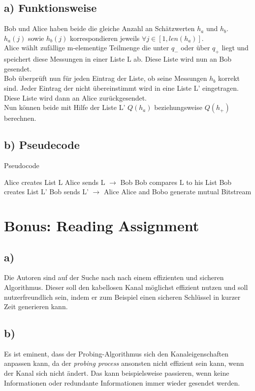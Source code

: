 \documentclass[12pt,a4paper]{article}
\begin{document}
\subsection*{a) Funktionsweise}
Bob und Alice haben beide die gleiche Anzahl an Schätzwerten $h_a$ und $h_b$.\\
$h_a(j)$ sowie $h_b(j)$ korrespondieren jeweils $\forall j \in [1,len(h_a)]$.\\
Alice wählt zufällige m-elementige Teilmenge die unter 
$q_-$ oder über $q_+$ liegt und speichert diese Messungen 
in einer Liste L ab. Diese Liste wird nun an Bob gesendet.\\
Bob überprüft nun für jeden Eintrag der Liste, ob seine 
Messungen $h_b$ korrekt sind. Jeder Eintrag der nicht 
übereinstimmt wird in eine Liste L' eingetragen. 
Diese Liste wird dann an Alice zurückgesendet.\\
Nun können beide mit Hilfe der Liste L' $Q(h_a)$ 
beziehungsweise $Q(h_+)$ berechnen.

\subsection*{b) Pseudecode}
\begin{algorithm}
\caption{Pseudocode}
\begin{algorithmic}[1]
\State Alice creates List L
\State Alice sends L $\to$ Bob
\State Bob compares L to his List
\State Bob creates List L'
\State Bob sends L' $\to$ Alice
\State Alice and Bobo generate mutual Bitstream
\end{algorithmic}
\end{algorithm}

\newpage
\section{Bonus: Reading Assignment}
\subsection*{a)}
Die Autoren sind auf der Suche nach nach einem effizienten 
und sicheren Algorithmus. Dieser soll den kabellosen Kanal 
möglichst effizient nutzen und soll nutzerfreundlich sein, 
indem er zum Beispiel einen sicheren Schlüssel in kurzer Zeit
generieren kann.

\subsection*{b)}
Es ist eminent, dass der Probing-Algorithmus sich den 
Kanaleigenschaften anpassen kann, da der 
\textit{probing process} ansonsten nicht effizient sein 
kann, wenn der Kanal sich nicht ändert. Das kann 
beispielsweise passieren, wenn keine Informationen 
oder redundante Informationen immer wieder gesendet werden.
\end{document}
